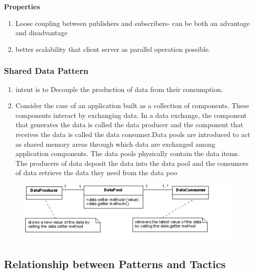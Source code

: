 \documentclass[a4paper]{article}
\begin{document}
\textbf{Properties}
\begin{enumerate}
\item Loose coupling between publishers and subscribers- can be both an advantage and disadvantage
\item better scalability that client server as parallel operation possible.
\end{enumerate}

\subsubsection{Shared Data Pattern}
\begin{enumerate}
\item intent is to Decouple the production of data from their consumption.
\item Consider the case of an application built as a collection of components. These components interact by exchanging data. In a data exchange, the component that generates the data is called the data producer and the component that receives the data is called the data consumer.Data pools are introduced to act as shared memory areas through which data are exchanged among application components. The data pools physically contain the data items. The producers of data deposit the data into the data pool and the consumers of data retrieve the data they need from the data poo

\end{enumerate}


\begin{figure}[h]
\centering 
\includegraphics[scale=0.8]{images/shareddata.png}
\end{figure}

\subsection{Relationship between Patterns and Tactics}
\end{document}
